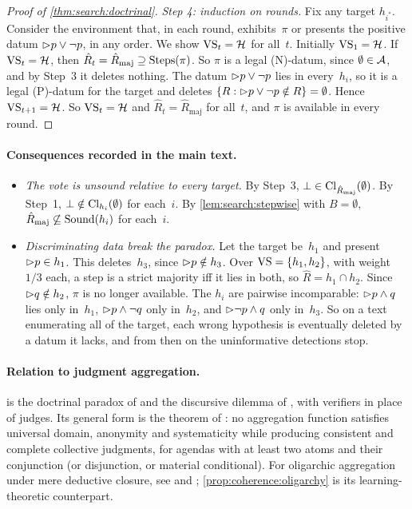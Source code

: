 \begin{proof}[Proof of \cref{thm:search:doctrinal}]
\emph{Step 4: induction on rounds.} Fix any target $h_{i^*}$. Consider the environment that, in each round, exhibits~$\pi$ or presents the positive datum $\rhd p\vee\neg p$, in any order. We show $\mathrm{VS}_t=\mathcal{H}$ for all~$t$. Initially $\mathrm{VS}_1=\mathcal{H}$. If $\mathrm{VS}_t=\mathcal{H}$, then $\hat R_t=\hat R_{\mathrm{maj}}\supseteq\mathrm{Steps}(\pi)$. So $\pi$ is a legal (N)-datum, since $\emptyset\in\mathcal{A}$, and by Step~3 it deletes nothing. The datum $\rhd p\vee\neg p$ lies in every~$h_i$, so it is a legal (P)-datum for the target and deletes $\{R:\rhd p\vee\neg p\notin R\}=\emptyset$. Hence $\mathrm{VS}_{t+1}=\mathcal{H}$. So $\mathrm{VS}_t=\mathcal{H}$ and $\hat R_t=\hat R_{\mathrm{maj}}$ for all~$t$, and $\pi$ is available in every round.
\end{proof}

\paragraph{Consequences recorded in the main text.}
\begin{itemize}
\item \emph{The vote is unsound relative to every target.} By Step~3, $\bot\in\mathrm{Cl}_{\hat R_{\mathrm{maj}}}(\emptyset)$. By Step~1, $\bot\notin\mathrm{Cl}_{h_i}(\emptyset)$ for each~$i$. By \cref{lem:search:stepwise} with $B=\emptyset$, $\hat R_{\mathrm{maj}}\not\subseteq\mathrm{Sound}(h_i)$ for each~$i$.
\item \emph{Discriminating data break the paradox.} Let the target be~$h_1$ and present $\rhd p\in h_1$. This deletes~$h_3$, since $\rhd p\notin h_3$. Over $\mathrm{VS}=\{h_1,h_2\}$, with weight $1/3$ each, a step is a strict majority iff it lies in both, so $\hat R=h_1\cap h_2$. Since $\rhd q\notin h_2$, $\pi$ is no longer available. The $h_i$ are pairwise incomparable: $\rhd p\wedge q$ lies only in~$h_1$, $\rhd p\wedge\neg q$ only in~$h_2$, and $\rhd\neg p\wedge q$ only in~$h_3$. So on a text enumerating all of the target, each wrong hypothesis is eventually deleted by a datum it lacks, and from then on the uninformative detections stop.
\end{itemize}

\paragraph{Relation to judgment aggregation.}
 is the doctrinal paradox of \citet{kornhauser1986unpacking} and the discursive dilemma of \citet{pettit2001deliberative}, with verifiers in place of judges. Its general form is the theorem of \citet{list2002aggregating}: no aggregation function satisfies universal domain, anonymity and systematicity while producing consistent and complete collective judgments, for agendas with at least two atoms and their conjunction (or disjunction, or material conditional). For oligarchic aggregation under mere deductive closure, see \citet{gardenfors2006representation} and \citet{dietrich2008judgment}; \cref{prop:coherence:oligarchy} is its learning-theoretic counterpart.
